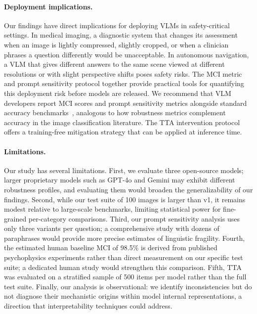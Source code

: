 \documentclass{cvpr}
\begin{document}
\paragraph{Deployment implications.}
Our findings have direct implications for deploying VLMs in safety-critical settings. In medical imaging, a diagnostic system that changes its assessment when an image is lightly compressed, slightly cropped, or when a clinician phrases a question differently would be unacceptable. In autonomous navigation, a VLM that gives different answers to the same scene viewed at different resolutions or with slight perspective shifts poses safety risks. The MCI metric and prompt sensitivity protocol together provide practical tools for quantifying this deployment risk before models are released. We recommend that VLM developers report MCI scores and prompt sensitivity metrics alongside standard accuracy benchmarks~\cite{hendrycks2019benchmarking}, analogous to how robustness metrics complement accuracy in the image classification literature. The TTA intervention protocol offers a training-free mitigation strategy that can be applied at inference time.

\paragraph{Limitations.}
Our study has several limitations. First, we evaluate three open-source models; larger proprietary models such as GPT-4o and Gemini may exhibit different robustness profiles, and evaluating them would broaden the generalizability of our findings. Second, while our test suite of 100 images is larger than v1, it remains modest relative to large-scale benchmarks, limiting statistical power for fine-grained per-category comparisons. Third, our prompt sensitivity analysis uses only three variants per question; a comprehensive study with dozens of paraphrases would provide more precise estimates of linguistic fragility. Fourth, the estimated human baseline MCI of 98.5\% is derived from published psychophysics experiments rather than direct measurement on our specific test suite; a dedicated human study would strengthen this comparison. Fifth, TTA was evaluated on a stratified sample of 500 items per model rather than the full test suite. Finally, our analysis is observational: we identify inconsistencies but do not diagnose their mechanistic origins within model internal representations, a direction that interpretability techniques could address.

\end{document}
